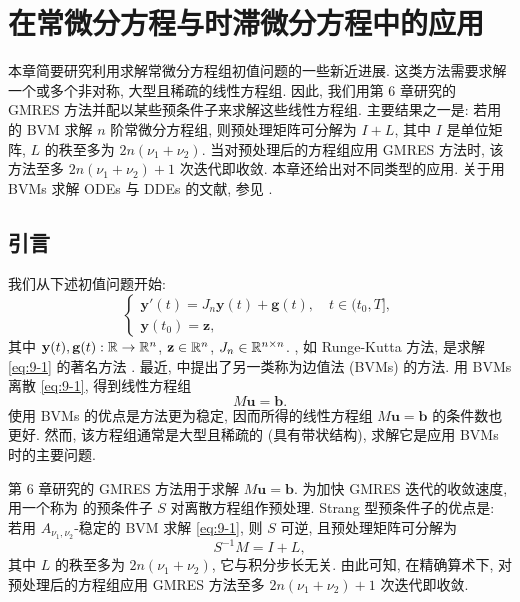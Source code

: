 \chapter{在常微分方程与时滞微分方程中的应用}
\label{ch:ode-dde}

本章简要研究利用求解常微分方程组初值问题的一些新近进展. 这类方法需要求解一个或多个非对称, 大型且稀疏的线性方程组. 因此, 我们用第 6 章研究的 GMRES 方法并配以某些预条件子来求解这些线性方程组. 主要结果之一是: 若用 的 BVM 求解 $n$ 阶常微分方程组, 则预处理矩阵可分解为 $I+L$, 其中 $I$ 是单位矩阵, $L$ 的秩至多为 $2n(\nu_1+\nu_2)$. 当对预处理后的方程组应用 GMRES 方法时, 该方法至多 $2n(\nu_1+\nu_2)+1$ 次迭代即收敛. 本章还给出对不同类型的应用. 关于用 BVMs 求解 ODEs 与 DDEs 的文献, 参见 \cite{src:5,src:8,src:10,src:17,src:19,src:44,src:45,src:47,src:48,src:55,src:58}.

\section{引言}
\label{sec:9-1}

我们从下述初值问题开始:
\begin{equation}
  \left\{
  \begin{array}{l}
    \mathbf{y}'(t)=J_n\mathbf{y}(t)+\mathbf{g}(t),\quad t\in(t_0,T],\\
    \mathbf{y}(t_0)=\mathbf{z},
  \end{array}
  \right.
  \label{eq:9-1}
\end{equation}
其中 $\mathbf{y}(t),\mathbf{g}(t):\mathbb{R}\to\mathbb{R}^n$, $\mathbf{z}\in\mathbb{R}^n$, $J_n\in\mathbb{R}^{n\times n}$. , 如 Runge-Kutta 方法, 是求解 \eqref{eq:9-1} 的著名方法 \cite{src:83}. 最近, \cite{src:10} 中提出了另一类称为边值法 (BVMs) 的方法. 用 BVMs 离散 \eqref{eq:9-1}, 得到线性方程组
\[
  M\mathbf{u}=\mathbf{b}.
\]
使用 BVMs 的优点是方法更为稳定, 因而所得的线性方程组 $M\mathbf{u}=\mathbf{b}$ 的条件数也更好. 然而, 该方程组通常是大型且稀疏的 (具有带状结构), 求解它是应用 BVMs 时的主要问题.

第 6 章研究的 GMRES 方法用于求解 $M\mathbf{u}=\mathbf{b}$. 为加快 GMRES 迭代的收敛速度, 用一个称为 \cite{src:19} 的预条件子 $S$ 对离散方程组作预处理. Strang 型预条件子的优点是: 若用 $A_{\nu_1,\nu_2}$-稳定的 BVM 求解 \eqref{eq:9-1}, 则 $S$ 可逆, 且预处理矩阵可分解为
\[
  S^{-1}M=I+L,
\]
其中 $L$ 的秩至多为 $2n(\nu_1+\nu_2)$, 它与积分步长无关. 由此可知, 在精确算术下, 对预处理后的方程组应用 GMRES 方法至多 $2n(\nu_1+\nu_2)+1$ 次迭代即收敛.

